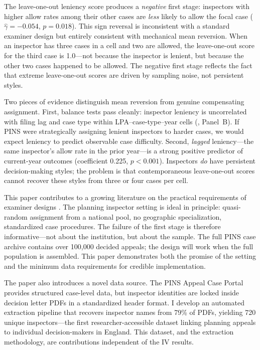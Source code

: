 \documentclass[12pt]{article}
\begin{document}
The leave-one-out leniency score produces a \textit{negative} first stage: inspectors with higher allow rates among their other cases are \textit{less} likely to allow the focal case ($\hat{\gamma} = -0.054$, $p = 0.018$). This sign reversal is inconsistent with a standard examiner design but entirely consistent with mechanical mean reversion. When an inspector has three cases in a cell and two are allowed, the leave-one-out score for the third case is 1.0---not because the inspector is lenient, but because the other two cases happened to be allowed. The negative first stage reflects the fact that extreme leave-one-out scores are driven by sampling noise, not persistent styles.

Two pieces of evidence distinguish mean reversion from genuine compensating assignment. First, balance tests pass cleanly: inspector leniency is uncorrelated with filing lag and case type within LPA--case-type--year cells (, Panel~B). If PINS were strategically assigning lenient inspectors to harder cases, we would expect leniency to predict observable case difficulty. Second, \textit{lagged} leniency---the same inspector's allow rate in the prior year---is a strong positive predictor of current-year outcomes (coefficient 0.225, $p < 0.001$). Inspectors \textit{do} have persistent decision-making styles; the problem is that contemporaneous leave-one-out scores cannot recover these styles from three or four cases per cell.

This paper contributes to a growing literature on the practical requirements of examiner designs \citep{frandsen2023judging, borusyak2023design}. The planning inspector setting is ideal in principle: quasi-random assignment from a national pool, no geographic specialization, standardized case procedures. The failure of the first stage is therefore informative---not about the institution, but about the sample. The full PINS case archive contains over 100,000 decided appeals; the design will work when the full population is assembled. This paper demonstrates both the promise of the setting and the minimum data requirements for credible implementation.

The paper also introduces a novel data source. The PINS Appeal Case Portal provides structured case-level data, but inspector identities are locked inside decision letter PDFs in a standardized header format. I develop an automated extraction pipeline that recovers inspector names from 79\% of PDFs, yielding 720 unique inspectors---the first researcher-accessible dataset linking planning appeals to individual decision-makers in England. This dataset, and the extraction methodology, are contributions independent of the IV results.
\end{document}
